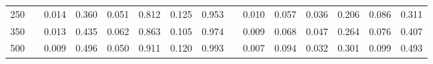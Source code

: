 % 
\begin{tabular}{ccccccccccccccc}
  \hline
  \hline
250 &  & 0.014 & 0.360 & 0.051 & 0.812 & 0.125 & 0.953 &  & 0.010 & 0.057 & 0.036 & 0.206 & 0.086 & 0.311 \\ 
  350 &  & 0.013 & 0.435 & 0.062 & 0.863 & 0.105 & 0.974 &  & 0.009 & 0.068 & 0.047 & 0.264 & 0.076 & 0.407 \\ 
  500 &  & 0.009 & 0.496 & 0.050 & 0.911 & 0.120 & 0.993 &  & 0.007 & 0.094 & 0.032 & 0.301 & 0.099 & 0.493 \\ 
   \hline
\end{tabular}
